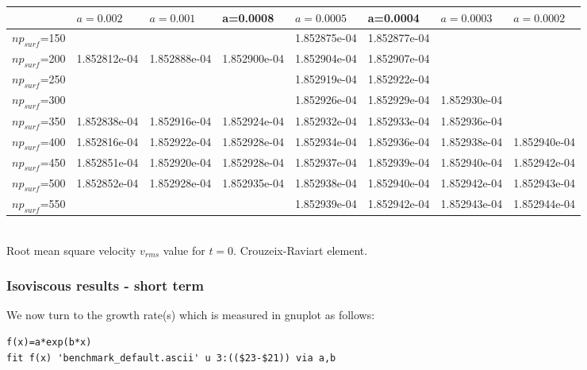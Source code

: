 \begin{center}
\begin{tabular}{|l|l|l|l|l|l|l|l|}
\hline
                & $a=0.002$     & $a=0.001$    & a=0.0008     & $a=0.0005$    & a=0.0004     & $a=0.0003$ & $a=0.0002$ \\ \hline
$np_{surf}$=150 &               &              &              & 1.852875e-04  & 1.852877e-04 & & \\ \hline
$np_{surf}$=200 & 1.852812e-04  & 1.852888e-04 & 1.852900e-04 & 1.852904e-04  & 1.852907e-04 & & \\ \hline
$np_{surf}$=250 &               &              &              & 1.852919e-04  & 1.852922e-04 & & \\ \hline
$np_{surf}$=300 &               &              &              & 1.852926e-04  & 1.852929e-04 & 1.852930e-04 & \\ \hline
$np_{surf}$=350 & 1.852838e-04  & 1.852916e-04 & 1.852924e-04 & 1.852932e-04  & 1.852933e-04 & 1.852936e-04 & \\ \hline
$np_{surf}$=400 & 1.852816e-04  & 1.852922e-04 & 1.852928e-04 & 1.852934e-04  & 1.852936e-04 & 1.852938e-04 & 1.852940e-04 \\ \hline
$np_{surf}$=450 & 1.852851e-04  & 1.852920e-04 & 1.852928e-04 & 1.852937e-04  & 1.852939e-04 & 1.852940e-04 & 1.852942e-04 \\ \hline
$np_{surf}$=500 & 1.852852e-04  & 1.852928e-04 & 1.852935e-04 & 1.852938e-04  & 1.852940e-04 & 1.852942e-04 & 1.852943e-04 \\ \hline
$np_{surf}$=550 &               &              &              & 1.852939e-04  & 1.852942e-04 & 1.852943e-04 & 1.852944e-04 \\ \hline
\end{tabular} \\
{\captionfont
Root mean square velocity $v_{rms}$ value for $t=0$. Crouzeix-Raviart element.}
\end{center}

\subsubsection*{Isoviscous results - short term}

We now turn to the growth rate(s) which is measured in gnuplot as follows:

\begin{verbatim}
f(x)=a*exp(b*x)
fit f(x) 'benchmark_default.ascii' u 3:(($23-$21)) via a,b
\end{verbatim}

